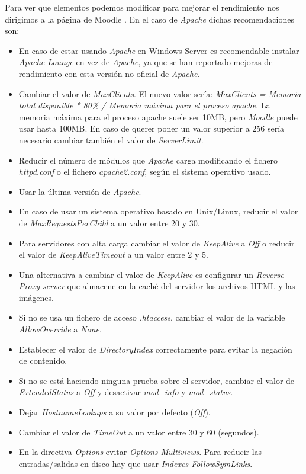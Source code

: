 \documentclass[a4paper,titlepage,12pt]{scrartcl}	%
\numberwithin{figure}{section} %
\numberwithin{table}{section} %
\begin{document}
	Para ver que elementos podemos modificar para mejorar el rendimiento nos dirigimos a la página de Moodle \cite{moodle}. En el caso de \textit{Apache} dichas recomendaciones son:
	\begin{itemize}
		\item En caso de estar usando \textit{Apache} en Windows Server es recomendable instalar \textit{Apache Lounge} \cite{apachelounge} en vez de \textit{Apache}, ya que se han reportado mejoras de rendimiento con esta versión no oficial de \textit{Apache}.
		\item Cambiar el valor de \textit{MaxClients}. El nuevo valor sería: \textit{MaxClients = Memoria total disponible * 80\% / Memoria máxima para el proceso apache}. La memoria máxima para el proceso apache suele ser 10MB, pero \textit{Moodle} puede usar hasta 100MB. En caso de querer poner un valor superior a 256 sería necesario cambiar también el valor de \textit{ServerLimit}.
		\item Reducir el número de módulos que \textit{Apache} carga modificando el fichero \textit{httpd.conf} o el fichero \textit{apache2.conf}, según el sistema operativo usado.
		\item Usar la última versión de \textit{Apache}.
		\item En caso de usar un sistema operativo basado en Unix/Linux, reducir el valor de \textit{MaxRequestsPerChild} a un valor entre 20 y 30.
		\item Para servidores con alta carga cambiar el valor de \textit{KeepAlive} a \textit{Off} o reducir el valor de \textit{KeepAliveTimeout} a un valor entre 2 y 5.
		\item Una alternativa a cambiar el valor de \textit{KeepAlive} es configurar un \textit{Reverse Proxy server} que almacene en la caché del servidor los archivos HTML y las imágenes.
		\item Si no se usa un fichero de acceso \textit{.htaccess}, cambiar el valor de la variable \textit{AllowOverride} a \textit{None}.
		\item Establecer el valor de \textit{DirectoryIndex} correctamente para evitar la negación de contenido.
		\item Si no se está haciendo ninguna prueba sobre el servidor, cambiar el valor de \textit{ExtendedStatus} a \textit{Off} y desactivar \textit{mod\_info} y \textit{mod\_status}.
		\item Dejar \textit{HostnameLookups} a su valor por defecto (\textit{Off}).
		\item Cambiar el valor de \textit{TimeOut} a un valor entre 30 y 60 (segundos).
		\item En la directiva \textit{Options} evitar \textit{Options Multiviews}. Para reducir las entradas/salidas en disco hay que usar \textit{Indexes FollowSymLinks}.
	\end{itemize}
	
\end{document}
